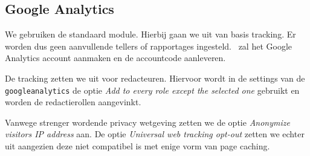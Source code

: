 \subsection{Google Analytics}\label{analytics}

We gebruiken de standaard  module. Hierbij gaan we uit van basis tracking. Er worden dus geen aanvullende tellers of rapportages ingesteld. \thecustomer \ zal het Google Analytics account aanmaken en de accountcode aanleveren.

De tracking zetten we uit voor redacteuren. Hiervoor wordt in de settings van de \texttt{googleanalytics} de optie \emph{Add to every role except the selected one} gebruikt en worden de redactierollen aangevinkt.

Vanwege strenger wordende privacy wetgeving zetten we de optie \emph{Anonymize visitors IP address} aan. De optie \emph{Universal web tracking opt-out} zetten we echter uit aangezien deze niet compatibel is met enige vorm van page caching.
